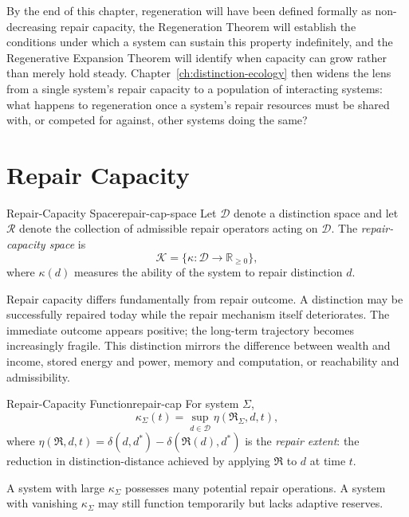 \documentclass[12pt,twoside,openright]{book}
\newcommand{\repair}{\mathfrak{R}}
\begin{document}
By the end of this chapter, regeneration will have been
defined formally as non-decreasing repair capacity, the
Regeneration Theorem will establish the conditions under
which a system can sustain this property indefinitely, and
the Regenerative Expansion Theorem will identify when
capacity can grow rather than merely hold steady.
Chapter~\ref{ch:distinction-ecology} then widens the lens
from a single system's repair capacity to a population of
interacting systems: what happens to regeneration once a
system's repair resources must be shared with, or competed
for against, other systems doing the same?

\section{Repair Capacity}
\label{sec:ch11-capacity}

\begin{definition}{Repair-Capacity Space}{repair-cap-space}
  Let $\mathcal{D}$ denote a distinction space and let
  $\mathcal{R}$ denote the collection of admissible repair
  operators acting on $\mathcal{D}$. The
  \emph{repair-capacity space} is
  \[
    \mathcal{K} = \{\kappa : \mathcal{D} \to \mathbb{R}_{\ge0}\},
  \]
  where $\kappa(d)$ measures the ability of the system to
  repair distinction $d$.
\end{definition}

Repair capacity differs fundamentally from repair outcome.
A distinction may be successfully repaired today while the
repair mechanism itself deteriorates. The immediate outcome
appears positive; the long-term trajectory becomes
increasingly fragile. This distinction mirrors the
difference between wealth and income, stored energy and
power, memory and computation, or reachability and
admissibility.

\begin{definition}{Repair-Capacity Function}{repair-cap}
  For system $\Sigma$,
  \[
    \kappa_\Sigma(t) = \sup_{d\in\mathcal{D}} \eta(\repair_\Sigma,d,t),
  \]
  where $\eta(\repair,d,t) = \delta(d,d^*) - \delta(\repair(d),d^*)$
  is the \emph{repair extent}: the reduction in
  distinction-distance achieved by applying $\repair$ to
  $d$ at time $t$.
\end{definition}

A system with large $\kappa_\Sigma$ possesses many
potential repair operations. A system with vanishing
$\kappa_\Sigma$ may still function temporarily but lacks
adaptive reserves.
\end{document}
